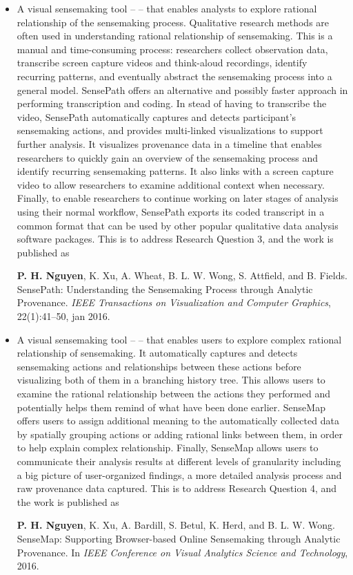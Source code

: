 \begin{itemize}
	\item A visual sensemaking tool -- \emph{} -- that enables analysts to explore rational relationship of the sensemaking process. Qualitative research methods are often used in understanding rational relationship of sensemaking. This is a manual and time-consuming process: researchers collect observation data, transcribe screen capture videos and think-aloud recordings, identify recurring patterns, and eventually abstract the sensemaking process into a general model. SensePath offers an alternative and possibly faster approach in performing transcription and coding. In stead of having to transcribe the video, SensePath automatically captures and detects participant's sensemaking actions, and provides multi-linked visualizations to support further analysis. It visualizes provenance data in a timeline that enables researchers to quickly gain an overview of the sensemaking process and identify recurring sensemaking patterns. It also links with a screen capture video to allow researchers to examine  additional context when necessary. Finally, to enable researchers to continue working on later stages of analysis using their normal workflow, SensePath exports its coded transcript in a common format that can be used by other popular qualitative data analysis software packages. This is to address Research Question 3, and the work is published as
	
	\textbf{P. H. Nguyen}, K. Xu, A. Wheat, B. L. W. Wong, S. Attfield, and B. Fields. SensePath: Understanding the Sensemaking Process through Analytic Provenance. \textit{IEEE Transactions on Visualization and Computer Graphics}, 22(1):41--50, jan 2016. 
	
	\item A visual sensemaking tool -- \emph{} -- that enables users to explore complex rational relationship of sensemaking. It automatically captures and detects sensemaking actions and relationships between these actions before visualizing both of them in a branching history tree. This allows users to examine the rational relationship between the actions they performed and potentially helps them remind of what have been done earlier. SenseMap offers users to assign additional meaning to the automatically collected data by spatially grouping actions or adding rational links between them, in order to help explain complex relationship. Finally, SenseMap allows users to communicate their analysis results at different levels of granularity including a big picture of user-organized findings, a more detailed analysis process and raw provenance data captured. This is to address Research Question 4, and the work is published as 

	\textbf{P. H. Nguyen}, K. Xu, A. Bardill, S. Betul, K. Herd, and B. L. W. Wong. SenseMap: Supporting Browser-based Online Sensemaking through Analytic Provenance. In \textit{IEEE Conference on Visual Analytics Science and Technology}, 2016.
\end{itemize}


